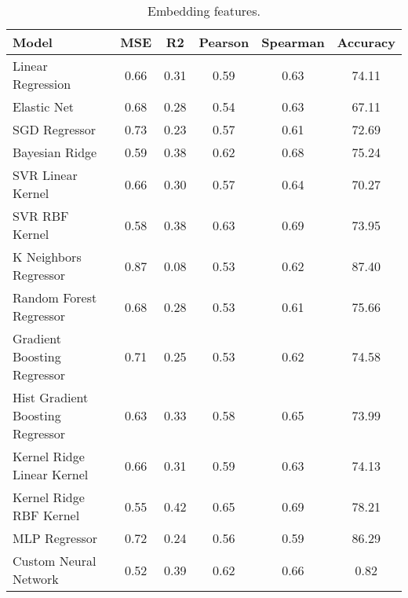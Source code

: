\begin{table}[ht]
    \begin{subtable}[t]{\textwidth}
        \centering
        \begin{tabular}{|l|c|c|c|c|c|}
            \hline
            Model & MSE & R2 & Pearson & Spearman & Accuracy \\
            \hline
            Linear Regression & 0.66 & 0.31 & 0.59 & 0.63 & 74.11 \\
            Elastic Net & 0.68 & 0.28 & 0.54 & 0.63 & 67.11 \\
            SGD Regressor & 0.73 & 0.23 & 0.57 & 0.61 & 72.69 \\
            Bayesian Ridge & 0.59 & 0.38 & 0.62 & 0.68 & 75.24 \\
            SVR Linear Kernel & 0.66 & 0.30 & 0.57 & 0.64 & 70.27 \\
            SVR RBF Kernel & 0.58 & 0.38 & 0.63 & 0.69 & 73.95 \\
            K Neighbors Regressor & 0.87 & 0.08 & 0.53 & 0.62 & 87.40 \\
            Random Forest Regressor & 0.68 & 0.28 & 0.53 & 0.61 & 75.66 \\
            Gradient Boosting Regressor & 0.71 & 0.25 & 0.53 & 0.62 & 74.58 \\
            Hist Gradient Boosting Regressor & 0.63 & 0.33 & 0.58 & 0.65 & 73.99 \\
            Kernel Ridge Linear Kernel & 0.66 & 0.31 & 0.59 & 0.63 & 74.13 \\
            Kernel Ridge RBF Kernel & 0.55 & 0.42 & 0.65 & 0.69 & 78.21 \\
            MLP Regressor & 0.72 & 0.24 & 0.56 & 0.59 & 86.29 \\
            Custom Neural Network & 0.52 & 0.39 & 0.62 & 0.66 & 0.82 \\
            \hline
        \end{tabular}
        \caption{Embedding features.}
        \label{tab:simple_models_results_embeddings}
    \end{subtable}    


\end{table}
